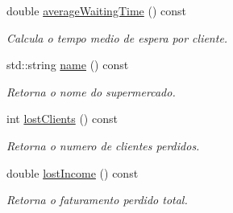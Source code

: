 \begin{DoxyCompactItemize}
double \hyperlink{classSupermarket_aa4ee29cd9ef76a00622dcc9afd409efd}{average\-Waiting\-Time} () const 
\begin{DoxyCompactList}\small\item\em Calcula o tempo medio de espera por cliente. \end{DoxyCompactList}\item 
std\-::string \hyperlink{classSupermarket_aad1cbadfc661d7097aa8e45b43a6de3c}{name} () const 
\begin{DoxyCompactList}\small\item\em Retorna o nome do supermercado. \end{DoxyCompactList}\item 
int \hyperlink{classSupermarket_af6a5e90ac46538a43854c562d75e763a}{lost\-Clients} () const 
\begin{DoxyCompactList}\small\item\em Retorna o numero de clientes perdidos. \end{DoxyCompactList}\item 
double \hyperlink{classSupermarket_a19d1badd6c3efe2dfa719e02a644051f}{lost\-Income} () const 
\begin{DoxyCompactList}\small\item\em Retorna o faturamento perdido total. \end{DoxyCompactList}\end{DoxyCompactItemize}


